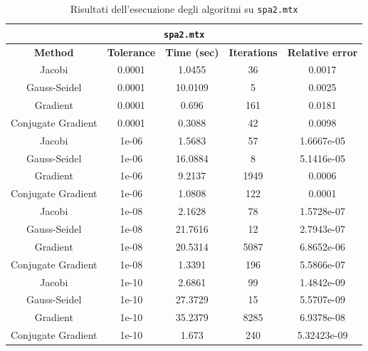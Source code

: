 \documentclass[12pt]{article}
\begin{document}
\begin{table}[!ht]
    \centering
    \begin{tabular}{ccccc}
    \toprule
    \multicolumn{5}{c}{\texttt{spa2.mtx}}\\
    \midrule
        \textbf{Method} & \textbf{Tolerance} & \textbf{Time (sec)} & \textbf{Iterations} & \textbf{Relative error} \\ \midrule
        Jacobi & 0.0001 & 1.0455 & 36 & 0.0017 \\ 
        Gauss-Seidel & 0.0001 & 10.0109 & 5 & 0.0025 \\ 
        Gradient & 0.0001 & 0.696 & 161 & 0.0181 \\ 
        Conjugate Gradient & 0.0001 & 0.3088 & 42 & 0.0098 \\ \midrule
        Jacobi & 1e-06 & 1.5683 & 57 & 1.6667e-05 \\ 
        Gauss-Seidel & 1e-06 & 16.0884 & 8 & 5.1416e-05 \\ 
        Gradient & 1e-06 & 9.2137 & 1949 & 0.0006 \\ 
        Conjugate Gradient & 1e-06 & 1.0808 & 122 & 0.0001 \\ \midrule
        Jacobi & 1e-08 & 2.1628 & 78 & 1.5728e-07 \\ 
        Gauss-Seidel & 1e-08 & 21.7616 & 12 & 2.7943e-07 \\ 
        Gradient & 1e-08 & 20.5314 & 5087 & 6.8652e-06 \\ 
        Conjugate Gradient & 1e-08 & 1.3391 & 196 & 5.5866e-07 \\ \midrule
        Jacobi & 1e-10 & 2.6861 & 99 & 1.4842e-09 \\ 
        Gauss-Seidel & 1e-10 & 27.3729 & 15 & 5.5707e-09 \\ 
        Gradient & 1e-10 & 35.2379 & 8285 & 6.9378e-08 \\ 
        Conjugate Gradient & 1e-10 & 1.673 & 240 & 5.32423e-09 \\   \bottomrule
    \end{tabular}
    \caption{Risultati dell'esecuzione degli algoritmi su \texttt{spa2.mtx}}
    \label{table:spa2-stats}
\end{table}
\end{document}

